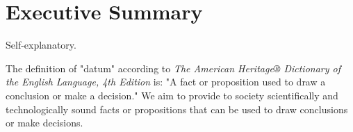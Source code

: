 \section{Executive Summary}
Self-explanatory.

The definition of "datum" according to \emph{The American Heritage® Dictionary of the English Language, 4th Edition} is: "A fact or proposition used to draw a conclusion or make a decision." We aim to provide to society scientifically and technologically sound facts or propositions that can be used to draw conclusions or make decisions.